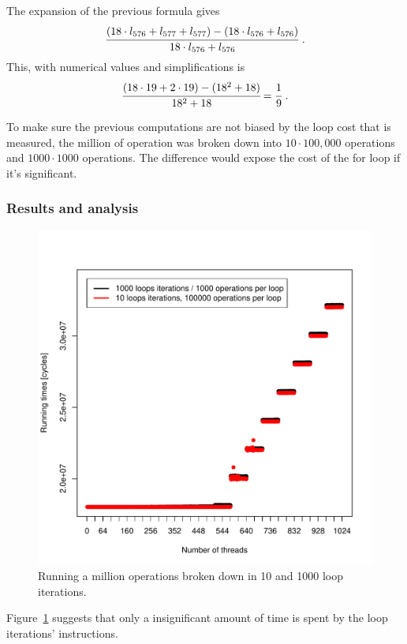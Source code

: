 \documentclass{report}
\def \scalingfactor{.8}
\begin{document}
    The expansion of the previous formula gives
    \[ \cfrac{(18\cdot l_{576} + l_{577} + l_{577}) - (18\cdot l_{576} + l_{576})}{18\cdot l_{576} + l_{576}} \text{  .}\]
    This, with numerical values and simplifications is
    \[ \cfrac{(18\cdot 19 + 2\cdot 19) - (18^2 + 18)}{18^2 + 18} = \cfrac{1}{9}\text{  .}\] 

    To make sure the previous computations are not biased by the loop cost that is measured, the 
    million of operation was broken down into $10\cdot100,000$ operations and $1000\cdot1000$ operations.
    The difference would expose the cost of the for loop if it's significant.

	\subsubsection{Results and analysis}
    \begin{figure}[H]
		\centering
    			\includegraphics[width=\scalingfactor\linewidth]{"graphics/for-sizes-superpositions"}
		\vspace{-15pt}
		\captionsetup{justification=centering}
		\caption{Running a million operations broken down in 10 and 1000 loop iterations.}
        \label{fig:for-cost}
	\end{figure}
    
    Figure~\ref{fig:for-cost} suggests that only a insignificant amount of time is spent by the loop
    iterations' instructions.
\end{document}
